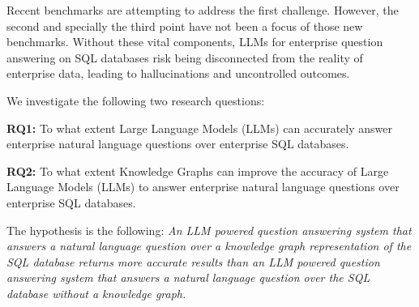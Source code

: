 \documentclass[11pt]{article}
\begin{document}
Recent benchmarks \cite{DBLP:conf/nips/LiHQYLLWQGHZ0LC23,lei2024spider20evaluatinglanguage} are attempting to address the first challenge. However, the second and specially the third point have not been a focus of those new benchmarks.
Without these vital components, LLMs for enterprise question answering on SQL databases risk being disconnected from the reality of enterprise data, leading to hallucinations and uncontrolled outcomes. 

We investigate the following two research questions: 

\textbf{RQ1:} To what extent Large Language Models (LLMs) can accurately answer enterprise natural language questions over enterprise SQL databases. 

\textbf{RQ2:} To what extent Knowledge Graphs can improve the accuracy of Large Language Models (LLMs) to answer enterprise natural language questions over enterprise SQL databases. 

The hypothesis is the following: \textit{An LLM powered question answering system that answers a natural language question over a knowledge graph representation of the SQL database returns more accurate results than an LLM powered question answering system that answers a natural language question over the SQL database without a knowledge graph.}

\end{document}
